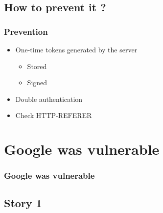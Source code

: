 \documentclass[svgnames]{beamer}
\begin{document}
\subsection{How to prevent it ?}
\begin{frame}
  \frametitle{Prevention} %
  \begin{itemize}
   \item One-time tokens generated by the server
   \begin{itemize}
    \item Stored  %
    \item Signed  %
   \end{itemize}
   \item Double authentication %
   \item Check HTTP-REFERER %

  \end{itemize}

\end{frame}




\section{Google was vulnerable}
\begin{frame}
  \frametitle{Google was vulnerable}
  \tableofcontents[currentsection]
\end{frame}
	
\subsection{Story 1}
\end{document}
